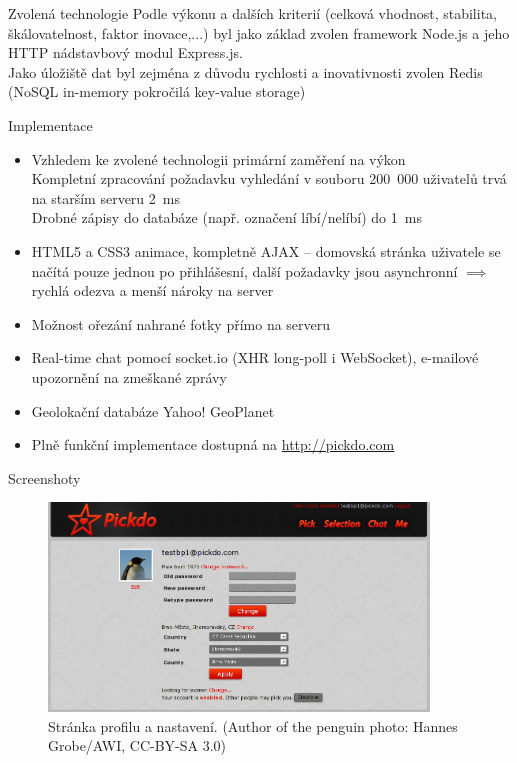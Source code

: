 \documentclass[xcolor=dvipsnames]{beamer}
\begin{document}
  \begin{frame}{Zvolená technologie}
  	Podle výkonu a dalších kriterií (celková vhodnost, stabilita, škálovatelnost, faktor inovace,...) byl jako základ zvolen framework Node.js a jeho HTTP nádstavbový modul Express.js. \\\bigskip
  	Jako úložiště dat byl zejména z důvodu rychlosti a inovativnosti zvolen Redis (NoSQL in-memory pokročilá key-value storage)
  \end{frame}
  \begin{frame}{Implementace}
    \begin{itemize}
    	\item Vzhledem ke zvolené technologii primární zaměření na výkon\\
    		Kompletní zpracování požadavku vyhledání v souboru 200~000 uživatelů trvá na starším serveru 2~ms\\
    		Drobné zápisy do databáze (např. označení líbí/nelíbí) do 1~ms
    	\item HTML5 a CSS3 animace, kompletně AJAX -- domovská stránka uživatele se načítá pouze jednou po přihlášesní, další požadavky jsou asynchronní $\implies$ rychlá odezva a menší nároky na server
    	\item Možnost ořezání nahrané fotky přímo na serveru
    	\item Real-time chat pomocí socket.io (XHR long-poll i WebSocket), e-mailové upozornění na zmeškané zprávy
    	\item Geolokační databáze Yahoo! GeoPlanet
    	\item Plně funkční implementace dostupná na \url{http://pickdo.com}
    \end{itemize}
  \end{frame}

  \begin{frame}{Screenshoty}
    \begin{figure}[h]
	  \centering
	    \includegraphics[width=0.9\textwidth]{../tex/screen-profile.png}
		  \caption{Stránka profilu a nastavení. (Author of the penguin photo: Hannes Grobe/AWI, CC-BY-SA 3.0)}
		  \label{fig:screen-profile}
	  \end{figure}
	\end{frame}
	
\end{document}
